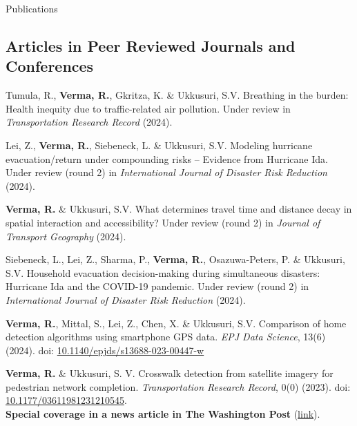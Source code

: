 \documentclass{CV} %
\begin{document}
\begin{rSection}{Publications}
    \subsection*{Articles in Peer Reviewed Journals and Conferences}
    \begin{etaremune}
        \item Tumula, R., \textbf{Verma, R.}, Gkritza, K. \& Ukkusuri, S.V. Breathing in the burden: Health inequity due to traffic-related air pollution. Under review in \textit{Transportation Research Record} (2024).
        
        \item Lei, Z., \textbf{Verma, R.}, Siebeneck, L. \& Ukkusuri, S.V. Modeling hurricane evacuation/return under compounding risks – Evidence from Hurricane Ida. Under review (round 2) in \textit{International Journal of Disaster Risk Reduction} (2024).

        \item \textbf{Verma, R.} \& Ukkusuri, S.V. What determines travel time and distance decay in spatial interaction and accessibility? Under review (round 2) in \textit{Journal of Transport Geography} (2024).

        \item Siebeneck, L., Lei, Z., Sharma, P., \textbf{Verma, R.}, Osazuwa-Peters, P. \& Ukkusuri, S.V. Household evacuation decision-making during simultaneous disasters: Hurricane Ida and the COVID-19 pandemic. Under review (round 2) in \textit{International Journal of Disaster Risk Reduction} (2024).

        \item \textbf{Verma, R.}, Mittal, S., Lei, Z., Chen, X. \& Ukkusuri, S.V. Comparison of home detection algorithms using smartphone GPS data.
        \textit{EPJ Data Science}, 13(6) (2024). doi: \href{https://doi.org/10.1140/epjds/s13688-023-00447-w}{10.1140/epjds/s13688-023-00447-w}
        
        \item \textbf{Verma, R.} \& Ukkusuri, S. V. Crosswalk detection from satellite imagery for pedestrian network completion. \textit{Transportation Research Record}, 0(0) (2023). doi: \href{https://doi.org/10.1177/03611981231210545}{10.1177/03611981231210545}.
        \\ \textbf{Special coverage in a news article in The Washington Post} (\href{https://www.washingtonpost.com/transportation/2023/02/25/sidewalks-crosswalks-study/}{link}).
        

\end{etaremune}
\end{rSection}
\end{document}
